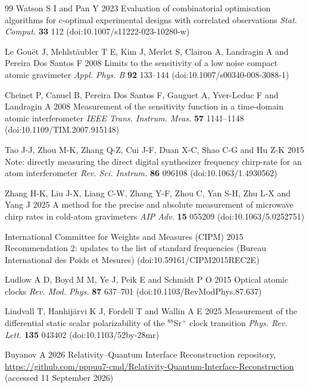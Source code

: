 \begin{thebibliography}{99}
Watson S I and Pan Y 2023 Evaluation of combinatorial optimisation algorithms for c-optimal experimental designs with correlated observations \emph{Stat. Comput.} \textbf{33} 112 (doi:10.1007/s11222-023-10280-w)

Le Gou\"et J, Mehlst\"aubler T E, Kim J, Merlet S, Clairon A, Landragin A and Pereira Dos Santos F 2008 Limits to the sensitivity of a low noise compact atomic gravimeter \emph{Appl. Phys. B} \textbf{92} 133--144 (doi:10.1007/s00340-008-3088-1)

Cheinet P, Canuel B, Pereira Dos Santos F, Gauguet A, Yver-Leduc F and Landragin A 2008 Measurement of the sensitivity function in a time-domain atomic interferometer \emph{IEEE Trans. Instrum. Meas.} \textbf{57} 1141--1148 (doi:10.1109/TIM.2007.915148)

Tao J-J, Zhou M-K, Zhang Q-Z, Cui J-F, Duan X-C, Shao C-G and Hu Z-K 2015 Note: directly measuring the direct digital synthesizer frequency chirp-rate for an atom interferometer \emph{Rev. Sci. Instrum.} \textbf{86} 096108 (doi:10.1063/1.4930562)

Zhang H-K, Liu J-X, Liang C-W, Zhang Y-F, Zhou C, Yan S-H, Zhu L-X and Yang J 2025 A method for the precise and absolute measurement of microwave chirp rates in cold-atom gravimeters \emph{AIP Adv.} \textbf{15} 055209 (doi:10.1063/5.0252751)

International Committee for Weights and Measures (CIPM) 2015 Recommendation 2: updates to the list of standard frequencies (Bureau International des Poids et Mesures) (doi:10.59161/CIPM2015REC2E)

Ludlow A D, Boyd M M, Ye J, Peik E and Schmidt P O 2015 Optical atomic clocks \emph{Rev. Mod. Phys.} \textbf{87} 637--701 (doi:10.1103/RevModPhys.87.637)

Lindvall T, Hanhij\"arvi K J, Fordell T and Wallin A E 2025 Measurement of the differential static scalar polarizability of the $^{88}$Sr$^+$ clock transition \emph{Phys. Rev. Lett.} \textbf{135} 043402 (doi:10.1103/52by-28mr)

Buyanov A 2026 Relativity--Quantum Interface Reconstruction repository, \url{https://github.com/pppuu7-cmd/Relativity-Quantum-Interface-Reconstruction} (accessed 11 September 2026)

\end{thebibliography}
